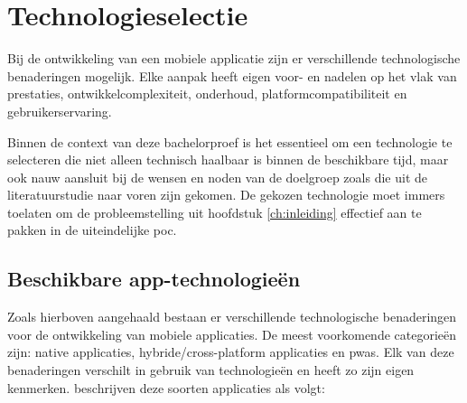 \newpage




\section{Technologieselectie}
\label{sec:technologieselectie}

\vspace{1em}

Bij de ontwikkeling van een mobiele applicatie zijn er verschillende technologische benaderingen mogelijk. Elke aanpak heeft eigen voor- en nadelen op het vlak van prestaties, ontwikkelcomplexiteit, onderhoud, platformcompatibiliteit en gebruikerservaring. 

\vspace{1em}

Binnen de context van deze bachelorproef is het essentieel om een technologie te selecteren die niet alleen technisch haalbaar is binnen de beschikbare tijd, maar ook nauw aansluit bij de wensen en noden van de doelgroep zoals die uit de literatuurstudie naar voren zijn gekomen. De gekozen technologie moet immers toelaten om de probleemstelling uit hoofdstuk \ref{ch:inleiding} effectief aan te pakken in de uiteindelijke \acrshort{poc}.

\vspace{1em}

\subsection{Beschikbare app-technologieën}
\label{subsec:app-tech}

\vspace{1em}

Zoals hierboven aangehaald bestaan er verschillende technologische benaderingen voor de ontwikkeling van mobiele applicaties. De meest voorkomende categorieën zijn: native applicaties, hybride/cross-platform applicaties en \acrlong{pwa}s. Elk van deze benaderingen verschilt in gebruik van technologieën en heeft zo zijn eigen kenmerken. \textcite{Gerges2024} beschrijven deze soorten applicaties als volgt:

